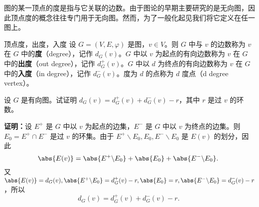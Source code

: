 

图的某一顶点的度是指与它关联的边数。由于图论的早期主要研究的是无向图，因此顶点度的概念往往专门用于无向图。然而，为了一般化起见我们将它定义在任一图上。

\begin{definition}{顶点度，出度，入度}
设 $G=(V,E,\varphi)$ 是图，$v\in V$。则 $G$ 中与 $v$ 的边数称为 $v$ 在 $G$ 中的\textbf{度}（degree），记作 $d_G(v)$。$G$ 中以 $v$ 为起点的有向边数称为 $v$ 在 $G$ 中的\textbf{出度}（out degree），记作 $d_G^+(v)$。$G$ 中以 $d$ 为终点的有向边数称为 $v$ 在 $G$ 中的\textbf{入度}（in degree），记作 $d_G^-(v)$。度为 $d$ 的点称为 $d$ 度点（d degree vertex）。
\end{definition}

\begin{example}{}
设 $G$ 是有向图。试证明 $d_G(v)=d_G^+(v)+d_G^-(v)-r$，其中 $r$ 是过 $v$ 的环数。

\textbf{证明：}设 $E^+$ 是 $G$ 中以 $v$ 为起点的边集，$E^-$ 是 $G$ 中以 $v$ 为终点的边集。则 $E_0=E^+\cap E^-$ 是过 $v$ 的环集。由于
$E^+\backslash E_0, E_0, E^-\backslash E_0$ 是 $E(v)$ 的划分，因此
\begin{equation}
\abs{E(v)}=\abs{E^+\backslash E_0}+\abs{E_0}+\abs{E^-\backslash E_0}.~
\end{equation}
又 $\abs{E(v)}=d_G(v),\abs{E^+\backslash E_0}=d_G^+(v)-r, \abs{E_0}=r, \abs{E^-\backslash E_0}=d_G^-(v)-r$，所以
\begin{equation}
d_G(v)=d_G^+(v)+d_G^-(v)-r.~
\end{equation}
\end{example}







